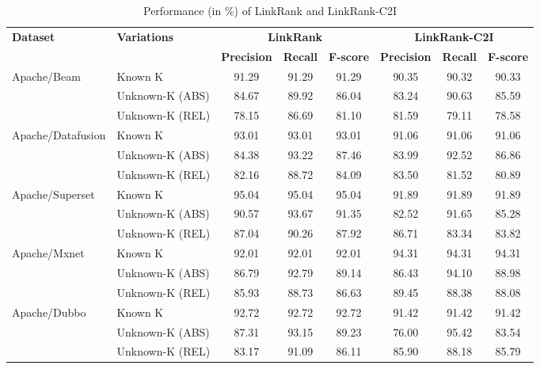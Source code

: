 \begin{table}[htbp]
\centering
\caption{Performance (in \%) of LinkRank and LinkRank-C2I} 
\renewcommand{\arraystretch}{1.3}
\label{rq2}
\begin{tabular}{@{}llcccccc@{}}
\toprule
\multirow{2}{*}{\textbf{Dataset}} & \multirow{2}{*}{\textbf{Variations}} & \multicolumn{3}{c}{\textbf{LinkRank}} & \multicolumn{3}{c}{\textbf{LinkRank-C2I}} \\
\cmidrule(lr){3-5} \cmidrule(lr){6-8}
 &  & \textbf{Precision} & \textbf{Recall} & \textbf{F-score} & \textbf{Precision} & \textbf{Recall} & \textbf{F-score} \\
\midrule

\multirow{3}{*}{Apache/Beam}
 & Known K         & 91.29 & 91.29 & 91.29 & 90.35 & 90.32 & 90.33 \\
 & Unknown-K (ABS) & 84.67 & 89.92 & 86.04 & 83.24 & 90.63 & 85.59 \\
 & Unknown-K (REL) & 78.15 & 86.69 & 81.10 & 81.59 & 79.11 & 78.58 \\
\midrule

\multirow{3}{*}{Apache/Datafusion}
 & Known K         & 93.01 & 93.01 & 93.01 & 91.06 & 91.06 & 91.06 \\
 & Unknown-K (ABS) & 84.38 & 93.22 & 87.46 & 83.99 & 92.52 & 86.86 \\
 & Unknown-K (REL) & 82.16 & 88.72 & 84.09 & 83.50 & 81.52 & 80.89 \\
\midrule

\multirow{3}{*}{Apache/Superset}
 & Known K         & 95.04 & 95.04 & 95.04 & 91.89 & 91.89 & 91.89 \\
 & Unknown-K (ABS) & 90.57 & 93.67 & 91.35 & 82.52 & 91.65 & 85.28 \\
 & Unknown-K (REL) & 87.04 & 90.26 & 87.92 & 86.71 & 83.34 & 83.82 \\
\midrule

\multirow{3}{*}{Apache/Mxnet}
 & Known K         & 92.01 & 92.01 & 92.01 & 94.31 & 94.31 & 94.31 \\
 & Unknown-K (ABS) & 86.79 & 92.79 & 89.14 & 86.43 & 94.10 & 88.98 \\
 & Unknown-K (REL) & 85.93 & 88.73 & 86.63 & 89.45 & 88.38 & 88.08 \\
\midrule

\multirow{3}{*}{Apache/Dubbo}
 & Known K         & 92.72 & 92.72 & 92.72 & 91.42 & 91.42 & 91.42 \\
 & Unknown-K (ABS) & 87.31 & 93.15 & 89.23 & 76.00 & 95.42 & 83.54 \\
 & Unknown-K (REL) & 83.17 & 91.09 & 86.11 & 85.90 & 88.18 & 85.79 \\
\midrule


\end{tabular}
\end{table}
